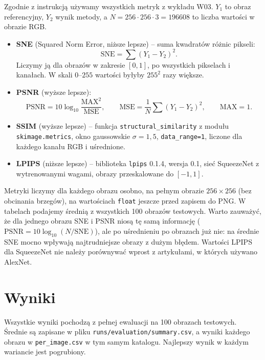 \documentclass[11pt,a4paper]{article}
\newcommand{\code}[1]{\texttt{\mdseries #1}}
\begin{document}
Zgodnie z instrukcją używamy wszystkich metryk z wykładu W03. $Y_1$ to obraz referencyjny, $Y_2$ wynik
metody, a $N = 256\cdot256\cdot3 = \num{196608}$ to liczba wartości w obrazie RGB.

\begin{itemize}
  \item \textbf{SNE} (Squared Norm Error, niższe lepsze) -- suma kwadratów różnic pikseli:
        \[ \text{SNE} = \sum (Y_1 - Y_2)^2 . \]
        Liczymy ją dla obrazów w zakresie $[0,1]$, po wszystkich pikselach i kanałach. W skali $0$--$255$
        wartości byłyby $255^2$ razy większe.
  \item \textbf{PSNR} (wyższe lepsze):
        \[ \text{PSNR} = 10\log_{10}\frac{\text{MAX}^2}{\text{MSE}}, \qquad \text{MSE} = \frac{1}{N}\sum(Y_1-Y_2)^2, \qquad \text{MAX}=1 . \]
  \item \textbf{SSIM} (wyższe lepsze) -- funkcja \code{structural\_similarity}
        z modułu \code{skimage.metrics}, okno gaussowskie $\sigma=1{,}5$, \code{data\_range=1},
        liczone dla każdego kanału RGB i uśrednione.
  \item \textbf{LPIPS} (niższe lepsze) -- biblioteka \code{lpips} 0.1.4, wersja 0.1,
        sieć SqueezeNet z wytrenowanymi wagami, obrazy przeskalowane do $[-1,1]$.
\end{itemize}

Metryki liczymy dla każdego obrazu osobno, na pełnym obrazie $256\times256$ (bez obcinania brzegów),
na wartościach \code{float} jeszcze przed zapisem do PNG. W tabelach podajemy średnią z wszystkich
100 obrazów testowych. Warto zauważyć, że dla jednego obrazu SNE i PSNR niosą tę samą informację
($\text{PSNR} = 10\log_{10}(N/\text{SNE})$), ale po uśrednieniu po obrazach już nie: na średnie SNE
mocno wpływają najtrudniejsze obrazy z dużym błędem. Wartości LPIPS dla SqueezeNet nie należy porównywać
wprost z artykułami, w których używano AlexNet.

\section{Wyniki}\label{sec:wyniki}

Wszystkie wyniki pochodzą z pełnej ewaluacji na 100 obrazach testowych. Średnie są zapisane
w pliku \code{runs/evaluation/summary.csv}, a wyniki każdego obrazu w \code{per\_image.csv}
w tym samym katalogu. Najlepszy wynik w każdym wariancie jest pogrubiony.
\end{document}
